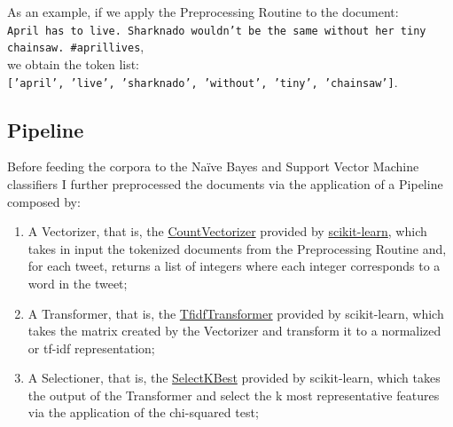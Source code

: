 \documentclass[11pt,twocolumn]{article}
\begin{document}
            \noindent
            As an example, if we apply the Preprocessing Routine to the document:\\

            \noindent
            \texttt{April has to live. Sharknado wouldn't be the same without her tiny chainsaw. \#aprillives},
            \\

            \noindent
            we obtain the token list: \\

            \noindent
            \texttt{['april', 'live', 'sharknado', 'without', 'tiny', 'chainsaw']}.

        \subsection{Pipeline} %
        \label{sub:pipeline}
            Before feeding the corpora to the Naïve Bayes and Support Vector Machine classifiers I further
            preprocessed the documents via the application of a Pipeline composed by:

            \begin{enumerate}
                \item A Vectorizer, that is, the
                \href{https://scikit-learn.org/stable/modules/generated/sklearn.feature_extraction.text.CountVectorizer.html#sklearn.feature_extraction.text.CountVectorizer}{CountVectorizer}
                provided by
                \href{https://scikit-learn.org/stable/index.html}{scikit-learn}, which takes in input
                the tokenized documents from the Preprocessing Routine and, for each tweet, returns a list
                of integers where each integer corresponds to a word in the tweet;
                \item A Transformer, that is, the
                \href{https://scikit-learn.org/stable/modules/generated/sklearn.feature_extraction.text.TfidfVectorizer.html#sklearn.feature_extraction.text.TfidfVectorizer}{TfidfTransformer}
                provided by scikit-learn, which takes the matrix created by the Vectorizer and
                transform it to a normalized or tf-idf representation;
                \item A Selectioner, that is, the
                \href{https://scikit-learn.org/stable/modules/generated/sklearn.feature_selection.SelectKBest.html}{SelectKBest} provided by scikit-learn, which
                takes the output of the Transformer and select the k most representative features via the
                application of the chi-squared test;
            \end{enumerate}
\end{document}
